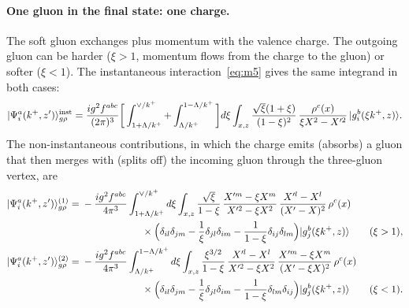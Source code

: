 \documentclass[aps,prd,onecolumn,superscriptaddress,nofootinbib,floatfix,longbibliography,11pt]{revtex4-2}
\numberwithin{equation}{section}
\begin{document}
\paragraph*{One gluon in the final state: one charge.} The soft gluon exchanges plus momentum with the valence charge. The outgoing gluon can be harder ($\xi>1$, momentum flows from the charge to the gluon) or softer ($\xi<1$). The instantaneous interaction~\eqref{eq:m5} gives the same integrand in both cases:
\begin{equation}
|\Psi^a_i(k^+,z')\rangle^{\rm inst}_{g\rho}=\frac{ig^2f^{abc}}{(2\pi)^3}\bigg[\int_{1+\Lambda/k^+}^{\vee/k^+}+\int_{\Lambda/k^+}^{1-\Lambda/k^+}\bigg]d\xi\int_{x,z}\frac{\sqrt\xi(1+\xi)}{(1-\xi)^2}\,\frac{\rho^c(x)}{\xi X^2-X'^2}\,|g^b_i(\xi k^+,z)\rangle .
\label{eq:inst}
\end{equation}
The non-instantaneous contributions, in which the charge emits (absorbs) a gluon that then merges with (splits off) the incoming gluon through the three-gluon vertex, are
\begin{align}
|\Psi^a_i(k^+,z')\rangle^{(1)}_{g\rho}={}&-\frac{ig^2f^{abc}}{4\pi^3}\int_{1+\Lambda/k^+}^{\vee/k^+}d\xi\int_{x,z}\frac{\sqrt\xi}{1-\xi}\,\frac{X'^m-\xi X^m}{X'^2-\xi X^2}\,\frac{X'^l-X^l}{(X'-X)^2}\,\rho^c(x)\notag\\
&\hspace{6em}\times\Big(\delta_{il}\delta_{jm}-\frac1\xi\delta_{jl}\delta_{im}-\frac{1}{1-\xi}\delta_{ij}\delta_{lm}\Big)|g^b_j(\xi k^+,z)\rangle\qquad(\xi>1),\label{eq:nonInst1}\\
|\Psi^a_i(k^+,z')\rangle^{(2)}_{g\rho}={}&-\frac{ig^2f^{abc}}{4\pi^3}\int_{\Lambda/k^+}^{1-\Lambda/k^+}d\xi\int_{x,z}\frac{\xi^{3/2}}{1-\xi}\,\frac{X'^l-X^l}{X'^2-\xi X^2}\,\frac{X'^m-\xi X^m}{(X'-\xi X)^2}\,\rho^c(x)\notag\\
&\hspace{6em}\times\Big(\delta_{il}\delta_{jm}-\frac1\xi\delta_{jl}\delta_{im}-\frac{1}{1-\xi}\delta_{lm}\delta_{ij}\Big)|g^b_j(\xi k^+,z)\rangle\qquad(\xi<1).\label{eq:nonInst2}
\end{align}
\end{document}
